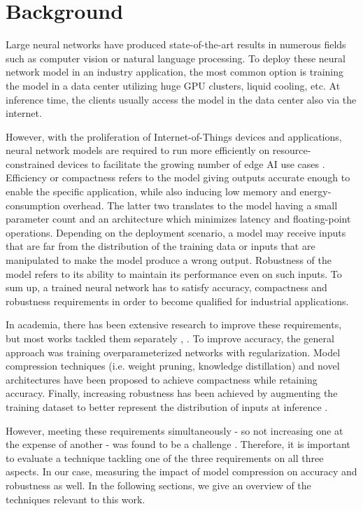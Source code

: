 \section{Background}\label{sec:background}

Large neural networks have produced state-of-the-art results in numerous fields such as computer vision
 or natural language processing. To deploy these neural network model in an industry application, the most common option is training 
 the model in a data center utilizing huge GPU clusters, liquid cooling, etc. At inference time, the clients usually access the model in the data center 
 also via the internet.

 However, with the proliferation of Internet-of-Things devices and applications, neural network models are required to run more efficiently on
 resource-constrained devices to facilitate the growing number of edge AI use cases \cite{edgeai}. Efficiency or compactness refers to the model giving outputs accurate
 enough to enable the specific application, while also inducing low memory and energy-consumption overhead. The latter two translates to the model having
 a small parameter count and an architecture which minimizes latency and floating-point operations. Depending on the deployment scenario, a model may
 receive inputs that are far from the distribution of the training data or inputs that are manipulated to make the model produce a wrong output. Robustness of 
 the model refers to its ability to maintain its performance even on such inputs.  To sum up, a trained neural network has to satisfy accuracy, compactness and robustness requirements in order to become qualified for industrial
  applications. 

  In academia, there has been extensive research to improve these requirements, but most works tackled them separately \cite{effnet}, \cite{pruning_survey24}.
  To improve accuracy, the general approach was training overparameterized networks with regularization. Model compression techniques (i.e. weight pruning, knowledge
  distillation) and novel architectures have been proposed to achieve compactness while retaining accuracy. Finally, increasing robustness has been achieved by 
  augmenting the training dataset to better represent the distribution of inputs at inference \cite{effectofadvtraining}.

  However, meeting these requirements simultaneously - so not increasing one at the expense of another - was found to be a challenge \cite{cards}.
  Therefore, it is important to evaluate a technique tackling one of the three requirements on all three aspects. In our case, measuring the impact of model
  compression on accuracy and robustness as well. In the following sections, we give an overview of the techniques relevant to this work. 

